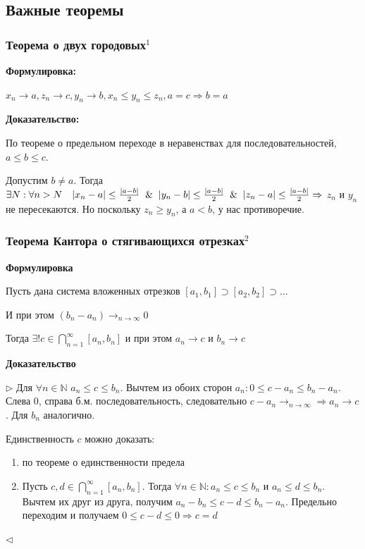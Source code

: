 \documentclass{article}
\def\dbl{\,\,}
\begin{document}
\newpage
\subsection{Важные теоремы}

\subsubsection{Теорема о двух городовых\texorpdfstring{$^1$}{}}
\textbf{Формулировка:}

$x_n \rightarrow a, z_n \rightarrow c, y_n \rightarrow b, x_n \le y_n \le z_n, a = c \Rightarrow b = a$

\textbf{Доказательство:}

По теореме о предельном переходе в неравенствах для последовательностей, $a \le b \le c$. 

Допустим $b \ne a$. Тогда $\exists N : \forall n > N \quad |x_n - a| \le \frac{|a - b|}{2} \And |y_n - b| \le \frac{|a - b|}{2} \And |z_n - a| \le \frac{|a - b|}{2} \Rightarrow$ $z_n$ и $y_n$ не пересекаются. Но поскольку $z_n \ge y_n$, а $a < b$, у нас противоречие.

\subsubsection{Теорема Кантора о стягивающихся отрезках\texorpdfstring{$^2$}{}}

\textbf{Формулировка}

Пусть дана система вложенных отрезков $[a_1, b_1] \supset [a_2, b_2] \supset \ldots$

И при этом $(b_n - a_n) \rightarrow_{n \rightarrow \infty} 0$

Тогда $\exists ! c \in \bigcap_{n = 1}^\infty{[a_n, b_n]}$ и при этом $a_n \rightarrow c$ и $b_n \rightarrow c$

\textbf{Доказательство}

$\rhd$ Для $\forall n \in \mathbb{N} \dbl a_n \le c \le b_n$. Вычтем из обоих сторон $a_n : 0 \le c - a_n \le b_n - a_n$. Слева 0, справа б.м. последовательность, следовательно $c - a_n \rightarrow_{n \rightarrow \infty} \Rightarrow a_n \rightarrow c$. Для $b_n$ аналогично.

Единственность $c$ можно доказать:
\begin{enumerate}
    \item по теореме о единственности предела
    \item Пусть $c, d \in \bigcap_{n = 1}^\infty{[a_n, b_n]}$. Тогда $\forall n \in \mathbb{N} : a_n \le c \le b_n$ и $a_n \le d \le b_n$. Вычтем их друг из друга, получим $a_n - b_n \le c - d \le b_n - a_n$. Предельно переходим и получаем $0 \le c - d \le 0 \Rightarrow c = d$
\end{enumerate}
$\lhd$
\end{document}
